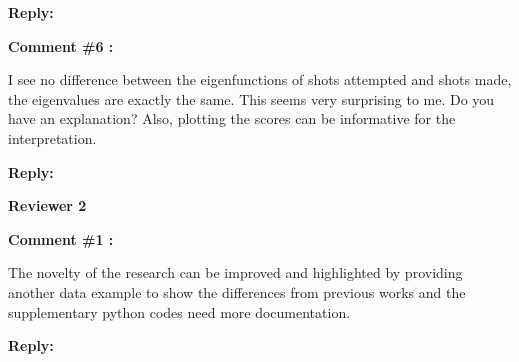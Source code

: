 \documentclass[11pt]{article}
\begin{document}
\textbf{Reply:}

\bigskip


\itshape

\textbf{Comment \#6 :}

I see no diﬀerence between the eigenfunctions of shots attempted and shots made, the eigenvalues are exactly the same. This seems very surprising to me. Do you have an explanation? Also, plotting the scores can be informative
for the interpretation.


\medskip

\normalfont

\textbf{Reply:}

\bigskip


\itshape



{\large \textbf{Reviewer 2} }


\bigskip

\itshape


\textbf{Comment \#1 :}

The novelty of the research can be improved and highlighted by providing another data example to show the differences from previous works and the supplementary python codes need more documentation.

\medskip

\normalfont

\textbf{Reply:} 


\bigskip

\itshape


 
\end{document}
